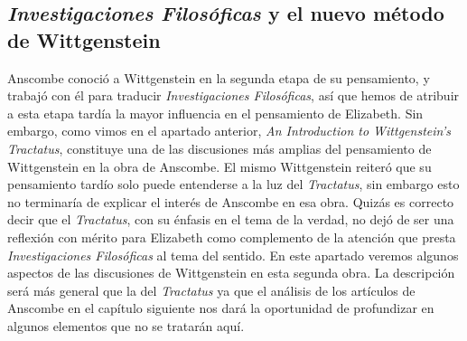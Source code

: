 \subsection{\emph{Investigaciones Filosóficas} y el nuevo método de Wittgenstein}

Anscombe conoció a Wittgenstein en la segunda etapa de su pensamiento, y trabajó con él para traducir \emph{Investigaciones Filosóficas}, así que hemos de atribuir a esta etapa tardía la mayor influencia en el pensamiento de Elizabeth. Sin embargo, como vimos en el apartado anterior, \emph{An Introduction to Wittgenstein's Tractatus}, constituye una de las discusiones más amplias del pensamiento de Wittgenstein en la obra de Anscombe. El mismo Wittgenstein reiteró que su pensamiento tardío solo puede entenderse a la luz del \emph{Tractatus}, sin embargo esto no terminaría de explicar el interés de Anscombe en esa obra. Quizás es correcto decir que el \emph{Tractatus}, con su énfasis en el tema de la verdad, no dejó de ser una reflexión con mérito para Elizabeth como complemento de la atención que presta \emph{Investigaciones Filosóficas} al tema del sentido\autocite[Cf.~][191--193]{teichmann2008ans}. En este apartado veremos algunos aspectos de las discusiones de Wittgenstein en esta segunda obra. La descripción será más general que la del \emph{Tractatus} ya que el análisis de los artículos de Anscombe en el capítulo siguiente nos dará la oportunidad de profundizar en algunos elementos que no se tratarán aquí.

